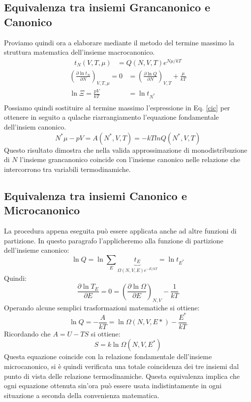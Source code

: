\documentclass[oneside]{amsbook}
\numberwithin{section}{chapter}
\numberwithin{equation}{section}
\numberwithin{figure}{section}
\begin{document}
\subsection{Equivalenza tra insiemi Grancanonico e Canonico}
Proviamo quindi ora a elaborare mediante il metodo del termine massimo la struttura matematica dell'insieme macrocanonico.
\begin{equation}
\label{cic}
\begin{aligned}
t_N(V,T,\mu) &= Q(N,V,T)e^{N\mu/kT} 
\end{aligned}
\end{equation}
\begin{equation}
\begin{aligned}
\left(\frac{\partial\ln t_N}{\partial N}\right)_{V,T,\mu}=0&=\left(\frac{\partial\ln Q}{\partial N}\right)_{V,T}+\frac{\mu}{kT}\\
\ln\Xi=\frac{pV}{kT}&=\ln t_{N^*}\\
\end{aligned}
\end{equation}
Possiamo quindi sostituire al termine massimo l'espressione in Eq. \ref{cic} per ottenere in seguito a qulache riarrangiamento l'equazione fondamentale dell'insiem canonico.
\begin{equation}
N^*\mu-pV=A(N^*,V,T)=-kTlnQ(N^*,V,T)
\end{equation}
Questo risultato dimostra che nella valida approssimazione di monodistribuzione di $N$ l'insieme grancanonico coincide con l'insieme canonico nelle relazione che intercorrono tra variabili termodinamiche.
\subsection{Equivalenza tra insiemi Canonico e Microcanonico}
La procedura appena eseguita può essere applicata anche ad altre funzioni di partizione. In questo paragrafo l'applicheremo alla funzione di partizione dell'insieme canonico:
\begin{equation}
\ln Q=\ln\sum_E\underbrace{t_E}_{\Omega(N,V,E)e^{-E/kT}}=\ln t_{E^*}
\end{equation}
Quindi:
\begin{equation}
\frac{\partial\ln T_E}{\partial E}=0=\left(\frac{\partial\ln\Omega}{\partial E}\right)_{N,V}-\frac{1}{kT}
\end{equation}
Operando alcune semplici trasformazioni matematiche si ottiene:
\begin{equation}
\ln Q=-\frac{A}{kT}=\ln\Omega(N,V,E*)-\frac{E^*}{kT}
\end{equation}
Ricordando che $A=U-TS$ si ottiene:
\begin{equation}
S=k\ln\Omega(N,V,E^*)
\end{equation}
Questa equazione coincide con la relazione fondamentale dell'insieme microcanonico, si è quindi verificata una totale coincidenza dei tre insiemi dal punto di vista delle relazione termodinamiche. Questa equivalenza implica che ogni equazione ottenuta sin'ora può essere usata indistintamente in ogni situazione a seconda della convenienza matematica.
\end{document}
